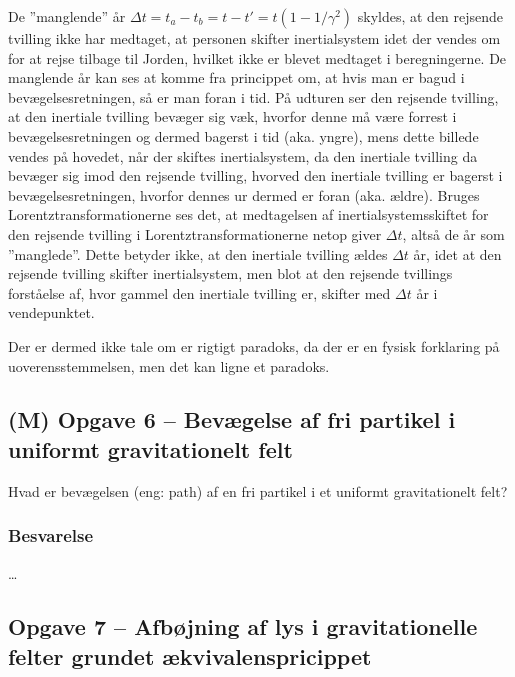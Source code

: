 \documentclass[../main.tex]{subfiles}
\begin{document}
De ''manglende'' år $\Delta t = t_a - t_b = t - t' = t (1 - 1/\gamma^2)$ skyldes, at den rejsende tvilling ikke har medtaget, at personen skifter inertialsystem idet der vendes om for at rejse tilbage til Jorden, hvilket ikke er blevet medtaget i beregningerne. De manglende år kan ses at komme fra princippet om, at hvis man er bagud i bevægelsesretningen, så er man foran i tid. På udturen ser den rejsende tvilling, at den inertiale tvilling bevæger sig væk, hvorfor denne må være forrest i bevægelsesretningen og dermed bagerst i tid (aka. yngre), mens dette billede vendes på hovedet, når der skiftes inertialsystem, da den inertiale tvilling da bevæger sig imod den rejsende tvilling, hvorved den inertiale tvilling er bagerst i bevægelsesretningen, hvorfor dennes ur dermed er foran (aka. ældre). Bruges Lorentztransformationerne ses det, at medtagelsen af inertialsystemsskiftet for den rejsende tvilling i Lorentztransformationerne netop giver $\Delta t$, altså de år som ''manglede''. Dette betyder ikke, at den inertiale tvilling ældes $\Delta t$ år, idet at den rejsende tvilling skifter inertialsystem, men blot at den rejsende tvillings forståelse af, hvor gammel den inertiale tvilling er, skifter med $\Delta t$ år i vendepunktet.

Der er dermed ikke tale om er rigtigt paradoks, da der er en fysisk forklaring på uoverensstemmelsen, men det kan ligne et paradoks.




\subsection{(M) Opgave 6 -- Bevægelse af fri partikel i uniformt gravitationelt felt}
\setcounter{subsection}{6}
\setcounter{equation}{0}

Hvad er bevægelsen (eng: path) af en fri partikel i et uniformt gravitationelt felt?


\subsubsection{Besvarelse}

\ldots




\subsection{Opgave 7 -- Afbøjning af lys i gravitationelle felter grundet ækvivalenspricippet}
\setcounter{subsection}{7}
\setcounter{equation}{0}
\end{document}
